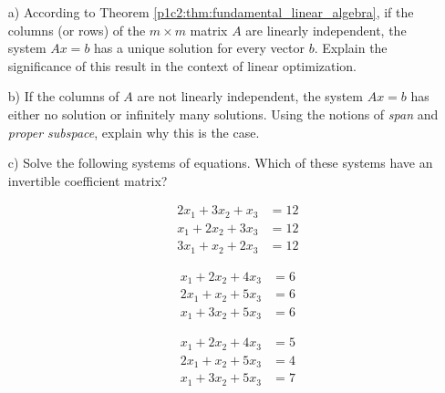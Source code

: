 \begin{itemize}
	\item[a)] According to Theorem \ref{p1c2:thm:fundamental_linear_algebra}, if the columns (or rows) of the $m \times m$ matrix $A$ are linearly independent, the system $Ax=b$ has a unique solution for every vector $b$. Explain the significance of this result in the context of linear optimization.
	\item[b)] If the columns of $A$ are not linearly independent, the system $Ax = b$ has either no solution or infinitely many solutions. Using the notions of \emph{span} and \emph{proper subspace}, explain why this is the case. 
	\item[c)] Solve the following systems of equations. Which of these systems have an invertible coefficient matrix? 
	\begin{itemize}
		\item[] \begin{align*}
			2x_1 + 3x_2 + x_3 &= 12\\
			x_1 + 2x_2 + 3x_3 &= 12\\
			3x_1 + x_2 + 2x_3 &= 12
		\end{align*}
		\item[] \begin{align*}
			x_1 + 2x_2 + 4x_3 &= 6\\
			2x_1 + x_2 + 5x_3 &= 6\\
			x_1 + 3x_2 + 5x_3 &= 6
		\end{align*}
		\item[] \begin{align*}
			x_1 + 2x_2 + 4x_3 &= 5\\
			2x_1 + x_2 + 5x_3 &= 4\\
			x_1 + 3x_2 + 5x_3 &= 7
		\end{align*}
	\end{itemize}
\end{itemize}
